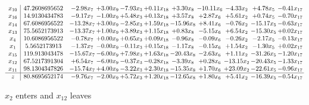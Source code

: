 \documentclass[9pt]{article}
\begin{document}
 \[\begin{array}{c| c c@{\hskip 2pt} c@{\hskip 2pt} c@{\hskip 2pt} c@{\hskip 2pt} c@{\hskip 2pt} c@{\hskip 2pt} c@{\hskip 2pt} c@{\hskip 2pt} c@{\hskip 2pt} }
 x_{10}   &  47.2608695652 & -2.98 x_{7} & +  3.00 x_{9} & -7.93 x_{3} & +  0.11 x_{18} & +  3.30 x_{8} & -10.11 x_{6} & -4.33 x_{2} & +  4.78 x_{5} & -0.41 x_{17}\\
 x_{16}   &  14.9130434783 & -9.17 x_{7} & -1.00 x_{9} & +  5.48 x_{3} & +  0.13 x_{18} & +  3.57 x_{8} & +  2.87 x_{6} & +  5.61 x_{2} & +  0.74 x_{5} & -0.70 x_{17}\\
 x_{14}   &  67.6086956522 & -13.28 x_{7} & +  3.00 x_{9} & -2.85 x_{3} & +  1.59 x_{18} & -15.96 x_{8} & +  8.41 x_{6} & -0.76 x_{2} & -15.17 x_{5} & -0.63 x_{17}\\
 x_{13}   &  75.5652173913 & -13.37 x_{7} & +  1.00 x_{9} & +  3.89 x_{3} & +  1.15 x_{18} & +  0.83 x_{8} & -5.15 x_{6} & +  6.54 x_{2} & -15.30 x_{5} & +  0.02 x_{17}\\
 x_{4}   &  10.6086956522 & -0.78 x_{7} & +  0.00 x_{9} & +  0.65 x_{3} & +  0.09 x_{18} & -0.96 x_{8} & -0.09 x_{6} & -0.26 x_{2} & -2.17 x_{5} & -0.13 x_{17}\\
 x_{1}   &  5.5652173913 & -1.37 x_{7} & -0.00 x_{9} & -0.11 x_{3} & +  0.15 x_{18} & -1.17 x_{8} & -0.15 x_{6} & +  1.54 x_{2} & -1.30 x_{5} & +  0.02 x_{17}\\
 x_{15}   &  119.913043478 & -15.67 x_{7} & -6.00 x_{9} & +  7.98 x_{3} & +  1.63 x_{18} & -20.43 x_{8} & -2.63 x_{6} & +  1.11 x_{2} & -31.26 x_{5} & -1.20 x_{17}\\
 x_{12}   &  67.5217391304 & +  6.54 x_{7} & -6.00 x_{9} & -0.37 x_{3} & -0.28 x_{18} & -3.39 x_{8} & +  0.28 x_{6} & -13.15 x_{2} & -20.43 x_{5} & -1.33 x_{17}\\
 x_{11}   &  98.1304347826 & -15.74 x_{7} & +  4.00 x_{9} & -3.22 x_{3} & +  2.30 x_{18} & -15.35 x_{8} & +  1.70 x_{6} & + 23.09 x_{2} & -22.61 x_{5} & -0.96 x_{17}\\
\hline
z    &  80.8695652174 & -9.76 x_{7} & -2.00 x_{9} & +  5.72 x_{3} & +  1.20 x_{18} & -12.65 x_{8} & +  1.80 x_{6} & +  5.41 x_{2} & -16.39 x_{5} & -0.54 x_{17}\\
\end{array}\]


 $ x_{2} $ enters and $ x_{12} $ leaves 
\end{document}
